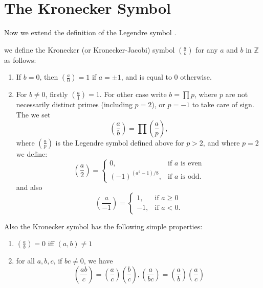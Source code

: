 \section{The Kronecker Symbol}
Now we extend the definition of the Legendre symbol \citep{cohen1993course}.
\begin{definition}
we define the Kronecker (or Kronecker-Jacobi) symbol $\left(\frac{a}{b}\right)$ for any $a$ and $b$ in $\mathbb{Z}$ as follows:
\begin{enumerate}
\item If $b=0$, then $\left(\frac{a}{0}\right)=1$ if $a=\pm1$, and is equal to 0 otherwise.
\item For $b\neq0$, firstly $\left(\frac{a}{1}\right)=1$. For other case write $b=\prod p$, where $p$ are not necessarily distinct primes (including $p=2$), or $p=-1$ to take care of sign. The we set $$\left(\frac{a}{b}\right)=\prod\left(\frac{a}{p}\right),$$ where $\left(\frac{a}{p}\right)$ is the Legendre symbol defined above for $p>2$, and where $p=2$ we define: $$\left(\frac{a}{2}\right)=\left\{\begin{array}{cc} 0, & \text{if } a \text{ is even}\\
(-1)^{(a^2-1)/8}, &  \text{if } a \text{ is odd.}
\end{array}\right.$$
and also $$\left(\frac{a}{-1}\right)=\left\{\begin{array}{cc} 1, & \text{if } a\geq0\\
-1, &  \text{if } a<0.
\end{array}\right.$$
\end{enumerate}
\end{definition}

Also the Kronecker symbol has the following simple properties:
\begin{proposition}
\begin{enumerate}
\item $\left(\frac{a}{b}\right)=0$ iff $(a,b)\neq1$
\item for all $a,b,c$, if $b c\neq0$, we have $$\left(\frac{ab}{c}\right)=\left(\frac{a}{c}\right)\left(\frac{b}{c}\right), \left(\frac{a}{bc}\right)=\left(\frac{a}{b}\right)\left(\frac{a}{c}\right)$$
\end{enumerate}
\end{proposition}